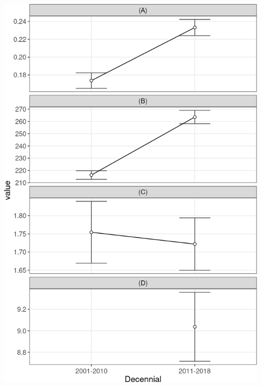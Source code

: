 \documentclass[10pt,landscape,a3paper]{article}
\begin{document}
\begin{center}\includegraphics{img/modelling/aa-eda-ts-19} \end{center}
\end{document}
